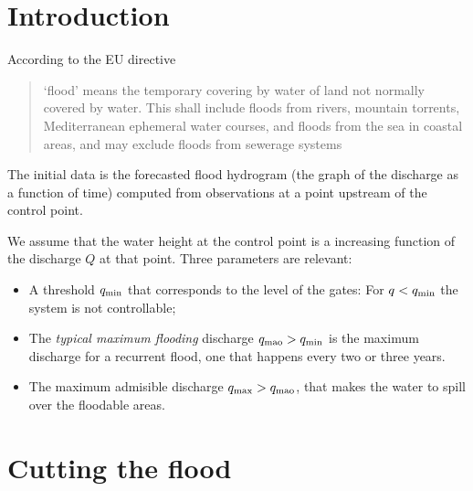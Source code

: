 \def\Qsub#1{q_{\mbox{\rm\scriptsize #1}}}
\def\qf{\Qsub{f}}
\def\qmao{\Qsub{mao}}
\def\qmax{\Qsub{max}}
\def\qi{\Qsub{i}}
\def\qmin{\Qsub{min}}

\section{Introduction}

According to the EU directive \cite{eurlex}
\begin{quote}
\textquoteleft{}flood\textquoteright{} means the temporary covering
by water of land not normally covered by water. This shall include
floods from rivers, mountain torrents, Mediterranean ephemeral water
courses, and floods from the sea in coastal areas, and may exclude
floods from sewerage systems 
\end{quote}
The initial data is the forecasted flood hydrogram (the graph of the
discharge as a function of time) computed from observations at a point
upstream of the control point. 

We assume that the water height at the control point is a increasing
function of the discharge $Q$ at that point. Three parameters are
relevant:
\begin{itemize}
\item A threshold $\qmin$ that corresponds to the level of the gates: For
$q<\qmin$ the system is not controllable;
\item The \emph{typical maximum flooding} discharge $\qmao>\qmin$ is the
maximum discharge for a recurrent flood, one that happens every two
or three years. 
\item The maximum admisible discharge $\qmax>\qmao$, that makes the water
to spill over the floodable areas.
\end{itemize}

\section{Cutting the flood}

